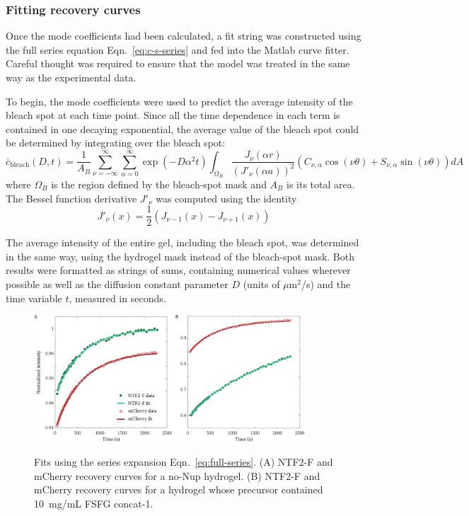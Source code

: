 \subsubsection{Fitting recovery curves}

Once the mode coefficients had been calculated, a fit string was constructed using the full series equation Eqn.~\ref{eq:c-s-series} and fed into the Matlab curve fitter.  Careful thought was required to ensure that the model was treated in the same way as the experimental data.

To begin, the mode coefficients were used to predict the average intensity of the bleach spot at each time point.  Since all the time dependence in each term is contained in one decaying exponential, the average value of the bleach spot could be determined by integrating over the bleach spot:
\begin{equation}
\bar{c}_\mathrm{bleach}(D,t) = \frac{1}{A_B}\sum_{\nu=-\infty}^{\infty} \sum_{\alpha = 0}^\infty   \exp\left(-D\alpha^2t\right)\int_{\Omega_B}\frac{J_\nu\left(\alpha r\right)}{\left(J'_\nu (\alpha a)\right)^2} \left(C_{\nu,\alpha}\cos(\nu\theta) + S_{\nu,\alpha} \sin(\nu\theta)\right) dA
\label{eq:avg-intensity}
\end{equation}
where $\Omega_B$ is the region defined by the bleach-spot mask and $A_B$ is its total area.  The Bessel function derivative $J'_\nu$ was computed using the identity
\begin{equation*}
J'_\nu(x) = \frac{1}{2}\left(J_{\nu-1}(x) - J_{\nu+1}(x)\right)
\end{equation*}

The average intensity of the entire gel, including the bleach spot, was determined in the same way, using the hydrogel mask instead of the bleach-spot mask.  Both results were formatted as strings of sums, containing numerical values wherever possible as well as the diffusion constant parameter $D$ (units of $\mu$m$^2$/s)  and the time variable $t$, measured in seconds.
\begin{figure}
\caption[Fits to recovery curves using Fourier transform solution.]{Fits using the series expansion Eqn.~\ref{eq:full-series}. (A) NTF2-F and mCherry recovery curves for a no-Nup hydrogel.  (B) NTF2-F and mCherry recovery curves for a hydrogel whose precursor contained 10~mg/mL FSFG concat-1.}
\centering
\includegraphics[width=0.9\textwidth]{figs/ch04/series-fits.pdf}
\label{fig:series-fits}
\end{figure} 

